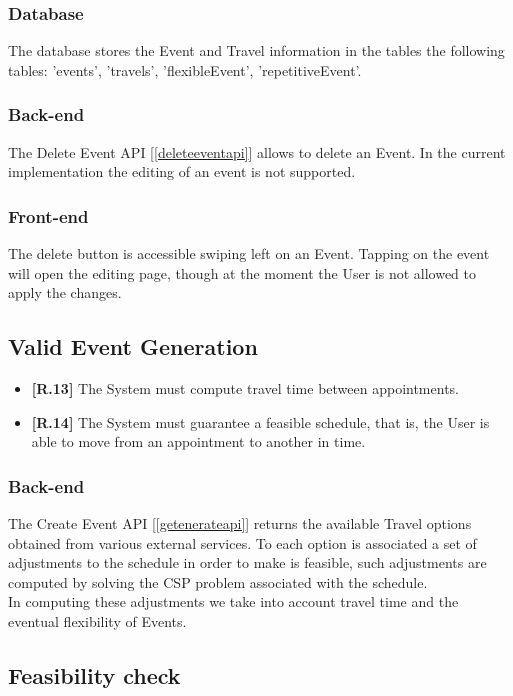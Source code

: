 \subsubsection*{Database}
The database stores the Event and Travel information in the tables the following tables: 'events', 'travels', 'flexibleEvent', 'repetitiveEvent'.

\subsubsection*{Back-end}
The Delete Event API [\ref{deleteeventapi}] allows to delete an Event.
In the current implementation the editing of an event is not supported.

\subsubsection*{Front-end}
The delete button is accessible swiping left on an Event.
Tapping on the event will open the editing page, though at the moment the User is not allowed to apply the changes.

\subsection{Valid Event Generation}
\begin{itemize}
	\item {\color{OliveGreen}\textbf{[R.13]}} The System must compute travel time between appointments.
	\item {\color{OliveGreen}\textbf{[R.14]}} The System must guarantee a feasible schedule, that is, the User is able to move from an appointment to another in time.
\end{itemize}

\subsubsection*{Back-end}
The Create Event API [\ref{getenerateapi}] returns the available Travel options obtained from various external services. To each option is associated a set of adjustments to the schedule in order to make is feasible, such adjustments are computed by solving the CSP problem associated with the schedule.\\
In computing these adjustments we take into account travel time and the eventual flexibility of Events.

\subsection{Feasibility check}

